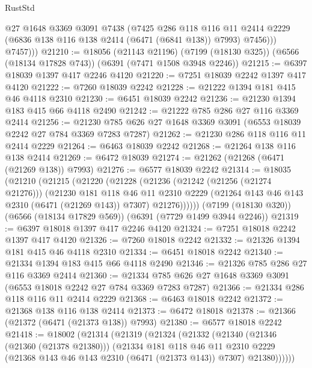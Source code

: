 \begin{lexlean}{RustStd}
\begin{coremodule}
              @27
              @1648
              @3369
              @3091
              @7438
              (@7425
                @286
                @118
                @116
                @11
                @2414
                @2229
                (@6836 @138 @116 @138 @2414 (@6471 (@6841 @138)) @7993)
                @7456)))
          @7457)))
@21210 := @18056
    (@21143 @21196)
    (@7199 (@18130 @325))
    (@6566 (@18134 @17828 @743))
    (@6391 (@7471 @1508 @3948 @2246))
@21215 := @6397 @18039 @1397 @417 @2246 @4120
@21220 := @7251 @18039 @2242 @1397 @417 @4120
@21222 := @7260 @18039 @2242
@21228 := @21222 @1394 @181 @415 @46 @4118 @2310
@21230 := @6451 @18039 @2242
@21236 := @21230 @1394 @183 @415 @66 @4118 @2490
@21242 := @21222 @785 @286 @27 @116 @3369 @2414
@21256 := @21230 @785 @626 @27 @1648 @3369 @3091 (@6553 @18039 @2242 @27 @784 @3369 @7283 @7287)
@21262 := @21230 @286 @118 @116 @11 @2414 @2229
@21264 := @6463 @18039 @2242
@21268 := @21264 @138 @116 @138 @2414
@21269 := @6472 @18039
@21274 := @21262 (@21268 (@6471 (@21269 @138)) @7993)
@21276 := @6577 @18039 @2242
@21314 := @18035
    (@21210
      (@21215
        (@21220
          (@21228
            (@21236
              (@21242 (@21256 (@21274 @21276)))
              (@21230
                @181
                @118
                @46
                @11
                @2310
                @2229
                (@21264 @143 @46 @143 @2310 (@6471 (@21269 @143)) @7307)
                @21276))))))
    (@7199 (@18130 @320))
    (@6566 (@18134 @17829 @569))
    (@6391 (@7729 @1499 @3944 @2246))
@21319 := @6397 @18018 @1397 @417 @2246 @4120
@21324 := @7251 @18018 @2242 @1397 @417 @4120
@21326 := @7260 @18018 @2242
@21332 := @21326 @1394 @181 @415 @46 @4118 @2310
@21334 := @6451 @18018 @2242
@21340 := @21334 @1394 @183 @415 @66 @4118 @2490
@21346 := @21326 @785 @286 @27 @116 @3369 @2414
@21360 := @21334 @785 @626 @27 @1648 @3369 @3091 (@6553 @18018 @2242 @27 @784 @3369 @7283 @7287)
@21366 := @21334 @286 @118 @116 @11 @2414 @2229
@21368 := @6463 @18018 @2242
@21372 := @21368 @138 @116 @138 @2414
@21373 := @6472 @18018
@21378 := @21366 (@21372 (@6471 (@21373 @138)) @7993)
@21380 := @6577 @18018 @2242
@21418 := @18002
    (@21314
      (@21319
        (@21324
          (@21332
            (@21340
              (@21346 (@21360 (@21378 @21380)))
              (@21334
                @181
                @118
                @46
                @11
                @2310
                @2229
                (@21368 @143 @46 @143 @2310 (@6471 (@21373 @143)) @7307)
                @21380))))))

\end{coremodule}
\end{lexlean}
